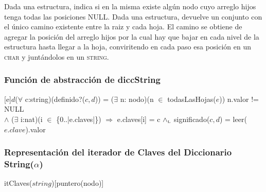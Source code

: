 



Dada una estructura, indica si en la misma existe alg\'un nodo cuyo arreglo hijos tenga todas las posiciones NULL.
Dada una estructura, devuelve un conjunto con el \'unico camino existente entre la raiz y cada hoja. El camino se obtiene de agregar la posici\'on del arreglo hijos por la cual hay que bajar en cada nivel de la estructura hasta llegar a la hoja, conviritendo en cada paso esa posici\'on en un \textsc{char} y junt\'andolos en un \textsc{string}.


\subsubsection{Funci\'on de abstracci\'on de diccString}
 [e]{$d$}{($\forall$ c:string)(definido?($c,d$)) = ($\exists$ n: nodo)(n $\in$ todasLasHojas($e$)) n.valor != NULL \\ $\land$ ($\exists$ i:nat)(i $\in$ \{0..|e.claves|\}) $\Rightarrow$ e.claves[i] = c $\land_{\mathrm{\scriptscriptstyle{L}}}$ significado($c,d$) = leer($e.clave$).valor}

  \subsubsection{Representaci\'on del iterador de Claves del Diccionario String($\alpha$)}



    \begin{Estructura}{itClaves($string$)}[puntero(nodo)]
    \end{Estructura}

